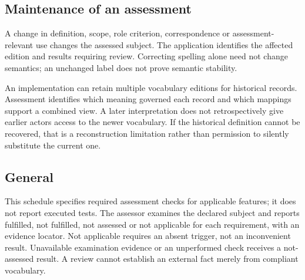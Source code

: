 \documentclass[11pt,a4paper]{article}
\begin{document}
\subsection{Maintenance of an assessment}
A change in definition, scope, role criterion, correspondence or assessment-relevant use changes the assessed subject. The application identifies the affected edition and results requiring review. Correcting spelling alone need not change semantics; an unchanged label does not prove semantic stability.

An implementation can retain multiple vocabulary editions for historical records. Assessment identifies which meaning governed each record and which mappings support a combined view. A later interpretation does not retrospectively give earlier actors access to the newer vocabulary. If the historical definition cannot be recovered, that is a reconstruction limitation rather than permission to silently substitute the current one.

\subsection{General}

This schedule specifies required assessment checks for applicable features; it does not report executed tests. The assessor examines the declared subject and reports fulfilled, not fulfilled, not assessed or not applicable for each requirement, with an evidence locator. Not applicable requires an absent trigger, not an inconvenient result. Unavailable examination evidence or an unperformed check receives a not-assessed result. A review cannot establish an external fact merely from compliant vocabulary.
\end{document}
